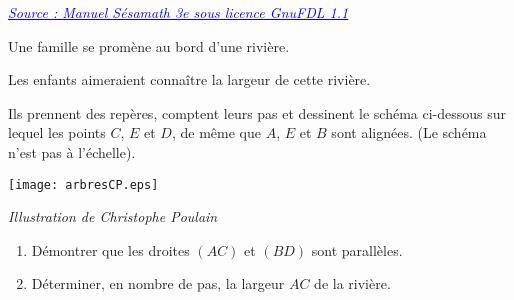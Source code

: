 
\medskip

\hrulefill\par
\href{https://manuel.sesamath.net/numerique/diapo.php?atome=48740&ordre=1}{\textcolor{blue}{\underline{\textit{Source : Manuel Sésamath 3e sous licence GnuFDL 1.1}}}}
\par\hrulefill
\medskip

Une famille se promène au bord d'une rivière.

Les enfants aimeraient connaître la largeur de cette rivière.

Ils prennent des repères, comptent leurs pas et dessinent le schéma ci-dessous sur lequel les points $C$, $E$ et $D$, de même que $A$, $E$ et $B$ sont alignées. (Le schéma n'est pas à l'échelle).

\begin{center}
\texttt{[image: arbresCP.eps]}
\par\vspace{0.25cm}
\hrulefill\par
\textit{Illustration de Christophe Poulain}
\end{center}

\begin{enumerate}[itemsep=1em]
\item Démontrer que les droites $(AC)$ et $(BD)$ sont parallèles.
\item Déterminer, en nombre de pas, la largeur $AC$ de la rivière.
\end{enumerate}\medskip

